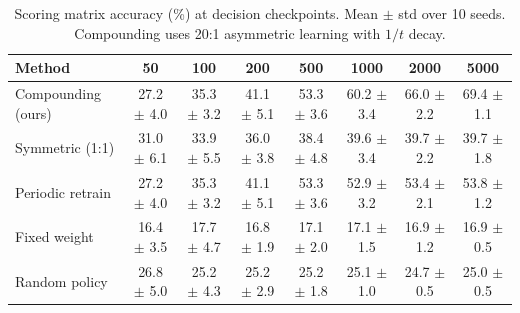 \begin{table}[t]
\centering
\caption{Scoring matrix accuracy (\%) at decision checkpoints. Mean $\pm$ std over 10 seeds. Compounding uses 20:1 asymmetric learning with $1/t$ decay.}
\label{tab:exp1}
\begin{tabular}{lccccccc}
\toprule
Method & 50 & 100 & 200 & 500 & 1000 & 2000 & 5000 \\
\midrule
Compounding (ours) & 27.2 $\pm$ 4.0 & 35.3 $\pm$ 3.2 & 41.1 $\pm$ 5.1 & 53.3 $\pm$ 3.6 & 60.2 $\pm$ 3.4 & 66.0 $\pm$ 2.2 & 69.4 $\pm$ 1.1 \\
Symmetric (1:1) & 31.0 $\pm$ 6.1 & 33.9 $\pm$ 5.5 & 36.0 $\pm$ 3.8 & 38.4 $\pm$ 4.8 & 39.6 $\pm$ 3.4 & 39.7 $\pm$ 2.2 & 39.7 $\pm$ 1.8 \\
Periodic retrain & 27.2 $\pm$ 4.0 & 35.3 $\pm$ 3.2 & 41.1 $\pm$ 5.1 & 53.3 $\pm$ 3.6 & 52.9 $\pm$ 3.2 & 53.4 $\pm$ 2.1 & 53.8 $\pm$ 1.2 \\
Fixed weight & 16.4 $\pm$ 3.5 & 17.7 $\pm$ 4.7 & 16.8 $\pm$ 1.9 & 17.1 $\pm$ 2.0 & 17.1 $\pm$ 1.5 & 16.9 $\pm$ 1.2 & 16.9 $\pm$ 0.5 \\
Random policy & 26.8 $\pm$ 5.0 & 25.2 $\pm$ 4.3 & 25.2 $\pm$ 2.9 & 25.2 $\pm$ 1.8 & 25.1 $\pm$ 1.0 & 24.7 $\pm$ 0.5 & 25.0 $\pm$ 0.5 \\
\bottomrule
\end{tabular}
\end{table}
